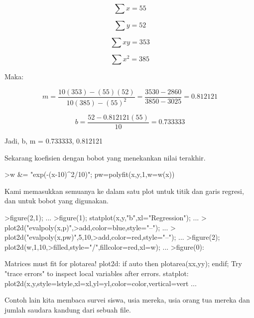 \documentclass[a4paper,10pt]{article}
\begin{document}
\begin{eulernotebook}
\begin{eulercomment}
\begin{eulercomment}
\begin{eulerformula}
\[
\sum x = 55
\]
\end{eulerformula}
\begin{eulerformula}
\[
\sum y = 52
\]
\end{eulerformula}
\begin{eulerformula}
\[
\sum xy = 353
\]
\end{eulerformula}
\begin{eulerformula}
\[
\sum x^2 = 385
\]
\end{eulerformula}
\begin{eulercomment}
Maka:\\
\end{eulercomment}
\begin{eulerformula}
\[
m = \frac{10 (353) - (55)(52)}{10 (385) - (55)^2} = \frac {3530-2860}{3850-3025} = 0.812121
\]
\end{eulerformula}
\begin{eulerformula}
\[
b = \frac{52 - 0.812121 (55)}{10}=0.733333
\]
\end{eulerformula}
\begin{eulercomment}
Jadi, b, m = 0.733333, 0.812121


Sekarang koefisien dengan bobot yang menekankan nilai terakhir.
\end{eulercomment}
\begin{eulerprompt}
>w &= "exp(-(x-10)^2/10)"; pw=polyfit(x,y,1,w=w(x))
\end{eulerprompt}
\begin{euleroutput}
  [4.71566,  0.38319]
\end{euleroutput}
\begin{eulercomment}
Kami memasukkan semuanya ke dalam satu plot untuk titik dan garis
regresi, dan untuk bobot yang digunakan.
\end{eulercomment}
\begin{eulerprompt}
>figure(2,1);  ...
>figure(1); statplot(x,y,"b",xl="Regression"); ...
>  plot2d("evalpoly(x,p)",>add,color=blue,style="--"); ...
>  plot2d("evalpoly(x,pw)",5,10,>add,color=red,style="--"); ...
>figure(2); plot2d(w,1,10,>filled,style="/",fillcolor=red,xl=w); ...
>figure(0):
\end{eulerprompt}
\begin{euleroutput}
  Matrices must fit for plotarea!
  plot2d:
      if auto then plotarea(xx,yy); endif;
  Try "trace errors" to inspect local variables after errors.
  statplot:
      plot2d(x,y,style=lstyle,xl=xl,yl=yl,color=color,vertical=vert ...
\end{euleroutput}
\begin{eulercomment}
Contoh lain kita membaca survei siswa, usia mereka, usia orang tua
mereka dan jumlah saudara kandung dari sebuah file.


\end{eulercomment}
\end{eulercomment}
\end{eulercomment}
\end{eulernotebook}
\end{document}
